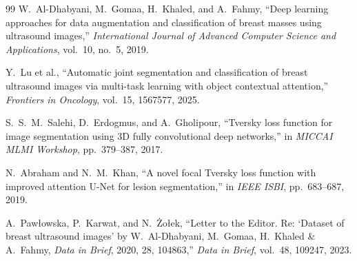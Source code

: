 \documentclass[11pt]{article}
\begin{document}
\begin{thebibliography}{99}
W.~Al-Dhabyani, M.~Gomaa, H.~Khaled, and A.~Fahmy,
``Deep learning approaches for data augmentation and classification of breast masses using ultrasound images,''
\emph{International Journal of Advanced Computer Science and Applications}, vol.~10, no.~5, 2019.

Y.~Lu et al.,
``Automatic joint segmentation and classification of breast ultrasound images via multi-task learning with object contextual attention,''
\emph{Frontiers in Oncology}, vol.~15, 1567577, 2025.

S.~S.~M.~Salehi, D.~Erdogmus, and A.~Gholipour,
``Tversky loss function for image segmentation using 3D fully convolutional deep networks,''
in \emph{MICCAI MLMI Workshop}, pp.~379--387, 2017.

N.~Abraham and N.~M.~Khan,
``A novel focal Tversky loss function with improved attention U-Net for lesion segmentation,''
in \emph{IEEE ISBI}, pp.~683--687, 2019.

A.~Paw{\l}owska, P.~Karwat, and N.~{\.Z}o{\l}ek,
``Letter to the Editor. Re: `Dataset of breast ultrasound images' by
W.~Al-Dhabyani, M.~Gomaa, H.~Khaled \& A.~Fahmy,
\emph{Data in Brief}, 2020, 28, 104863,''
\emph{Data in Brief}, vol.~48, 109247, 2023.

\end{thebibliography}
\end{document}
